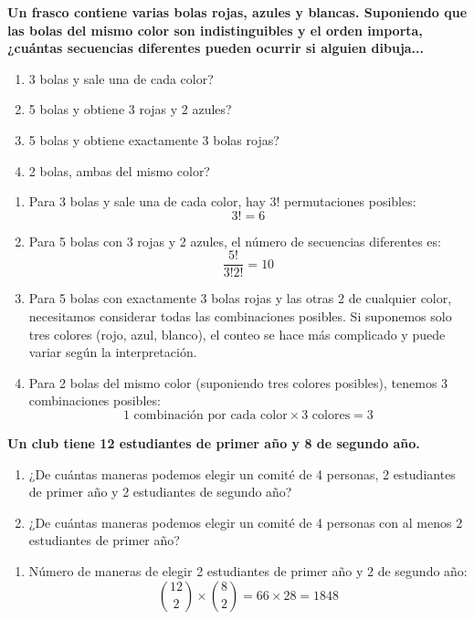 \documentclass[answers]{exam} %
\begin{document}
\begin{questions}
    \question \large\textbf{Un frasco contiene varias bolas rojas, azules y blancas. Suponiendo que las bolas del mismo color son indistinguibles y el orden importa, ¿cuántas secuencias diferentes pueden ocurrir si alguien dibuja...}
    \begin{enumerate}[label=\alph*.]
        \item 3 bolas y sale una de cada color?
        \item 5 bolas y obtiene 3 rojas y 2 azules?
        \item 5 bolas y obtiene exactamente 3 bolas rojas?
        \item 2 bolas, ambas del mismo color?
    \end{enumerate}
    \begin{solution}
        \begin{enumerate}[label=\alph*.]
            \item Para 3 bolas y sale una de cada color, hay \(3!\) permutaciones posibles:
                  \[
                      3! = 6
                  \]

            \item Para 5 bolas con 3 rojas y 2 azules, el número de secuencias diferentes es:
                  \[
                      \frac{5!}{3!2!} = 10
                  \]

            \item Para 5 bolas con exactamente 3 bolas rojas y las otras 2 de cualquier color, necesitamos considerar todas las combinaciones posibles. Si suponemos solo tres colores (rojo, azul, blanco), el conteo se hace más complicado y puede variar según la interpretación.

            \item Para 2 bolas del mismo color (suponiendo tres colores posibles), tenemos 3 combinaciones posibles:
                  \[
                      1 \text{ combinación por cada color} \times 3 \text{ colores} = 3
                  \]
        \end{enumerate}
    \end{solution}

    \vspace{0.5cm}

    \question \large\textbf{Un club tiene 12 estudiantes de primer año y 8 de segundo año.}
    \begin{enumerate}[label=\alph*.]
        \item ¿De cuántas maneras podemos elegir un comité de 4 personas, 2 estudiantes de primer año y 2 estudiantes de segundo año?
        \item ¿De cuántas maneras podemos elegir un comité de 4 personas con al menos 2 estudiantes de primer año?
    \end{enumerate}
    \begin{solution}
        \begin{enumerate}[label=\alph*.]
            \item Número de maneras de elegir 2 estudiantes de primer año y 2 de segundo año:
                  \[
                      \binom{12}{2} \times \binom{8}{2} = 66 \times 28 = 1848
                  \]


\end{enumerate}
\end{solution}
\end{questions}
\end{document}
